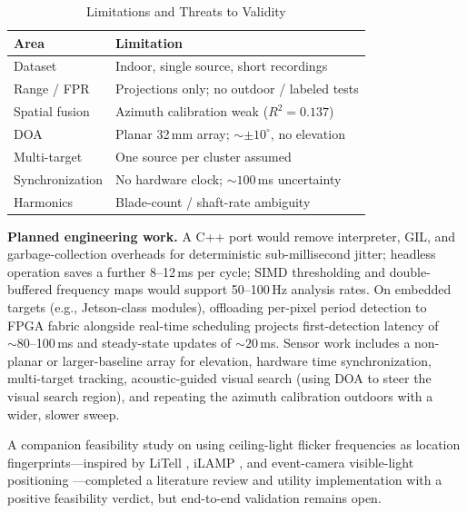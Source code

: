 \documentclass[conference]{IEEEtran}
\begin{document}
\begin{table}[t]
\caption{Limitations and Threats to Validity}
\label{tab:limits}
\centering
\begin{tabular}{@{}p{2.0cm}p{5.2cm}@{}}
\toprule
\textbf{Area} & \textbf{Limitation} \\
\midrule
Dataset & Indoor, single source, short recordings \\
Range / FPR & Projections only; no outdoor / labeled tests \\
Spatial fusion & Azimuth calibration weak ($R^2 = 0.137$) \\
DOA & Planar 32\,mm array; ${\sim}\pm 10^{\circ}$, no elevation \\
Multi-target & One source per cluster assumed \\
Synchronization & No hardware clock; ${\sim}100$\,ms uncertainty \\
Harmonics & Blade-count / shaft-rate ambiguity \\
\bottomrule
\end{tabular}
\end{table}

\textbf{Planned engineering work.} A C++ port would remove interpreter,
GIL, and garbage-collection overheads for deterministic sub-millisecond
jitter; headless operation saves a further 8--12\,ms per cycle; SIMD
thresholding and double-buffered frequency maps would support
50--100\,Hz analysis rates. On embedded targets (e.g., Jetson-class
modules), offloading per-pixel period detection to FPGA fabric alongside
real-time scheduling projects first-detection latency of
${\sim}80$--100\,ms and steady-state updates of ${\sim}20$\,ms. Sensor
work includes a non-planar or larger-baseline array for elevation,
hardware time synchronization, multi-target tracking, acoustic-guided
visual search (using DOA to steer the visual search region), and
repeating the azimuth calibration outdoors with a wider, slower sweep.

A companion feasibility study on using ceiling-light flicker frequencies
as location fingerprints---inspired by LiTell \cite{zhang2016litell},
iLAMP \cite{zhu2017ilamp}, and event-camera visible-light positioning
\cite{wang2020vlp}---completed a literature review and utility
implementation with a positive feasibility verdict, but end-to-end
validation remains open.
\end{document}
